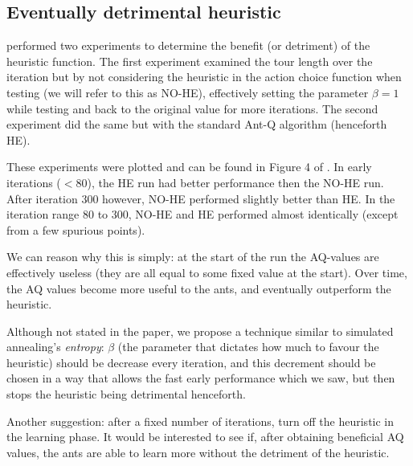 \subsection{Eventually detrimental heuristic}

\textcite{gambardella1995ant} performed two experiments to determine the benefit (or detriment) of the heuristic function. The first experiment examined the tour length over the iteration but by not considering the heuristic in the action choice function when testing (we will refer to this as NO-HE), effectively setting the parameter $\beta = 1$ while testing and back to the original value for more iterations. The second experiment did the same but with the standard Ant-Q algorithm (henceforth HE).

These experiments were plotted and can be found in Figure 4 of \cite{gambardella1995ant}. In early iterations ($<80$), the HE run had better performance then the NO-HE run. After iteration 300 however, NO-HE performed slightly better than HE. In the iteration range 80 to 300, NO-HE and HE performed almost identically (except from a few spurious points). 

We can reason why this is simply: at the start of the run the AQ-values are effectively useless (they are all equal to some fixed value at the start). Over time, the AQ values become more useful to the ants, and eventually outperform the heuristic. 

Although not stated in the paper, we propose a technique similar to simulated annealing's \emph{entropy}: $\beta$ (the parameter that dictates how much to favour the heuristic) should be decrease every iteration, and this decrement should be chosen in a way that allows the fast early performance which we saw, but then stops the heuristic being detrimental henceforth. 

Another suggestion: after a fixed number of iterations, turn off the heuristic in the learning phase. It would be interested to see if, after obtaining beneficial AQ values, the ants are able to learn more without the detriment of the heuristic. 